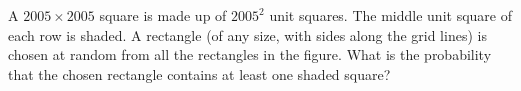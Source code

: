A $2005\times2005$ square is made up of $2005^2$ unit squares. The middle unit square of each row is shaded. A rectangle (of any size, with sides along the grid lines) is chosen at random from all the rectangles in the figure. What is the probability that the chosen rectangle contains at least one shaded square?
